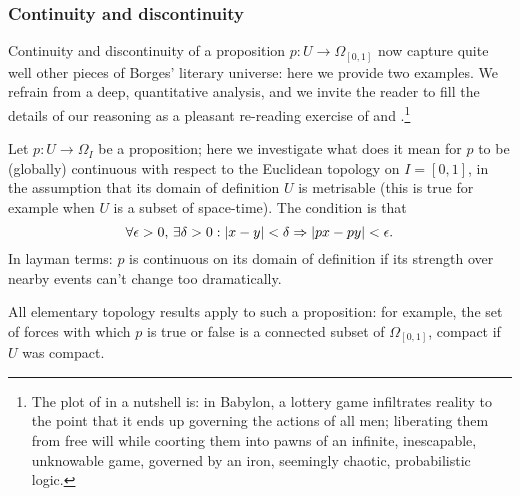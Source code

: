 \subsubsection{Continuity and discontinuity} Continuity and discontinuity of a proposition $p : U \to \Omega_{[0,1]}$ now capture quite well other pieces of Borges' literary universe: here we provide two examples. We refrain from a deep, quantitative analysis, and we invite the reader to fill the details of our reasoning as a pleasant re-reading exercise of \cite{babil} and \cite{tlonEN}.\footnote{The plot of \cite{babil} in a nutshell is: in Babylon, a lottery game infiltrates reality to the point that it ends up governing the actions of all men; liberating them from free will while coorting them into pawns of an infinite, inescapable, unknowable game, governed by an iron, seemingly chaotic, probabilistic logic.}
\begin{remark}\label{continuiti}
	Let $p : U \to \Omega_I$ be a proposition; here we investigate what does it mean for $p$ to be (globally) continuous with respect to the Euclidean topology on $I=[0,1]$, in the assumption that its domain of definition $U$ is metrisable (this is true for example when $U$ is a subset of space-time). The condition is that
	\[ \forall \epsilon > 0,\,\exists \delta > 0 : |x-y|< \delta \Rightarrow |px-py| < \epsilon. \]
	In layman terms: $p$ is continuous on its domain of definition if its strength over nearby events can't change too dramatically.

	All elementary topology results apply to such a proposition: for example, the set of forces with which $p$ is true or false is a connected subset of $\Omega_{[0,1]}$, compact if $U$ was compact.
\end{remark}
